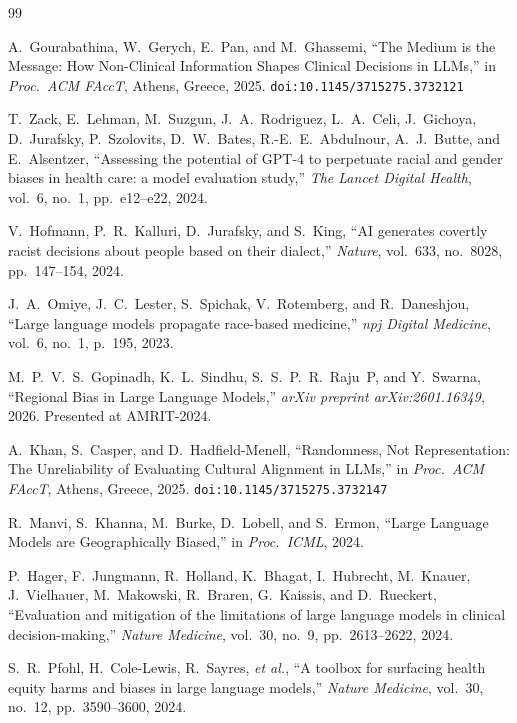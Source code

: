 \documentclass[12pt,a4paper]{article}
\begin{document}
\begin{thebibliography}{99}

A.~Gourabathina, W.~Gerych, E.~Pan, and M.~Ghassemi, ``The Medium is the Message: How Non-Clinical Information Shapes Clinical Decisions in LLMs,'' in \emph{Proc.\ ACM FAccT}, Athens, Greece, 2025. \texttt{doi:10.1145/3715275.3732121}

T.~Zack, E.~Lehman, M.~Suzgun, J.~A.~Rodriguez, L.~A.~Celi, J.~Gichoya, D.~Jurafsky, P.~Szolovits, D.~W.~Bates, R.-E.~E.~Abdulnour, A.~J.~Butte, and E.~Alsentzer, ``Assessing the potential of GPT-4 to perpetuate racial and gender biases in health care: a model evaluation study,'' \emph{The Lancet Digital Health}, vol.~6, no.~1, pp.~e12--e22, 2024.

V.~Hofmann, P.~R.~Kalluri, D.~Jurafsky, and S.~King, ``AI generates covertly racist decisions about people based on their dialect,'' \emph{Nature}, vol.~633, no.~8028, pp.~147--154, 2024.

J.~A.~Omiye, J.~C.~Lester, S.~Spichak, V.~Rotemberg, and R.~Daneshjou, ``Large language models propagate race-based medicine,'' \emph{npj Digital Medicine}, vol.~6, no.~1, p.~195, 2023.

M.~P.~V.~S.~Gopinadh, K.~L.~Sindhu, S.~S.~P.~R.~Raju~P, and Y.~Swarna, ``Regional Bias in Large Language Models,'' \emph{arXiv preprint arXiv:2601.16349}, 2026. Presented at AMRIT-2024.

A.~Khan, S.~Casper, and D.~Hadfield-Menell, ``Randomness, Not Representation: The Unreliability of Evaluating Cultural Alignment in LLMs,'' in \emph{Proc.\ ACM FAccT}, Athens, Greece, 2025. \texttt{doi:10.1145/3715275.3732147}

R.~Manvi, S.~Khanna, M.~Burke, D.~Lobell, and S.~Ermon, ``Large Language Models are Geographically Biased,'' in \emph{Proc.\ ICML}, 2024.

P.~Hager, F.~Jungmann, R.~Holland, K.~Bhagat, I.~Hubrecht, M.~Knauer, J.~Vielhauer, M.~Makowski, R.~Braren, G.~Kaissis, and D.~Rueckert, ``Evaluation and mitigation of the limitations of large language models in clinical decision-making,'' \emph{Nature Medicine}, vol.~30, no.~9, pp.~2613--2622, 2024.

S.~R.~Pfohl, H.~Cole-Lewis, R.~Sayres, \emph{et al.}, ``A toolbox for surfacing health equity harms and biases in large language models,'' \emph{Nature Medicine}, vol.~30, no.~12, pp.~3590--3600, 2024.


\end{thebibliography}
\end{document}
